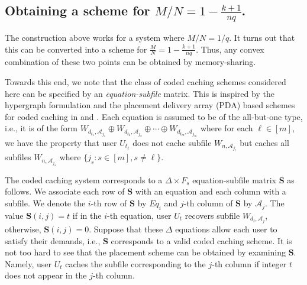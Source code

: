 \documentclass[journal,twocolumn]{IEEEtran}
\theoremstyle{definition}
\newtheorem{claim}{Claim}
\newcommand{\calA}{\mathcal{A}}
\newcommand{\bfS}{\mathbf{S}}
\newcommand{\aditya}[1]{\marginpar{+}{\bf Aditya's remark}: {\em #1}}
\begin{document}
\subsection{Obtaining a scheme for $M/N = 1 - \frac{k+1}{nq}$.}
The construction above works for a system where $M/N=1/q$. It turns out that this can be converted into a scheme for $\frac{M}{N} = 1 - \frac{k+1}{nq}$. Thus, any convex combination of these two points can be obtained by memory-sharing.

Towards this end, we note that the class of coded caching schemes considered here can be specified by an \emph{equation-subfile} matrix. This is inspired by the hypergraph formulation and the placement delivery array (PDA) based schemes for coded caching in \cite{shangguan2016centralized} and \cite{yan_et_al17}. Each equation is assumed to be of the all-but-one type, i.e., it is of the form $W_{d_{t_1},\calA_{j_1}} \oplus W_{d_{t_2},\calA_{j_2}} \oplus \cdots \oplus W_{d_{t_{m}},\calA_{j_{m}}}$ where for each $\ell \in [m]$, we have the property that user $U_{t_\ell}$ does not cache subfile $W_{n,\calA_{j_\ell}}$ but caches all subfiles $W_{n,\calA_{j_s}}$ where $\{j_s : s \in [m], s \neq \ell\}$. %

The coded caching system corresponds to a $\Delta\times F_s$ equation-subfile matrix $\bfS$ as follows. We associate each row of $\bfS$ with an equation and each column with a subfile. We denote the $i$-th row of $\bfS$ by $Eq_i$ and $j$-th column of $\bfS$ by $\calA_j$. The value $\bfS(i,j)=t$ if in the $i$-th equation, user $U_t$ recovers subfile $W_{d_t,\calA_j}$, otherwise, $\bfS(i,j)=0$. Suppose that these $\Delta$ equations allow each user to satisfy their demands, i.e., $\bfS$ corresponds to a valid coded caching scheme. It is not too hard to see that the placement scheme can be obtained by examining $\bfS$. Namely, user $U_t$ caches the subfile corresponding to the $j$-th column if integer $t$ does not appear in the $j$-th column.
\end{document}
